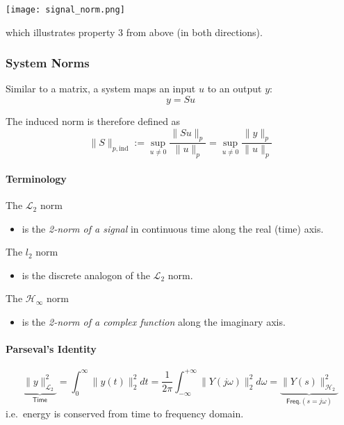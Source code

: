 \newpar{}

\begin{center}
    \texttt{[image: signal\_norm.png]}
\end{center}
which illustrates property 3 from above (in both directions).

\newpar{}
\subsubsection{System Norms}
Similar to a matrix, a system maps an input $u$ to an output $y$:
\noindent\begin{equation*}
    y=Su
\end{equation*}

The induced norm is therefore defined as
\noindent\begin{equation*}
    \|S\|_{p,\mathrm{ind}}:=\sup_{u\neq0}\frac{\|Su\|_p}{\|u\|_p}=\sup_{u\neq0}\frac{\|y\|_p}{\|u\|_p}
\end{equation*}

\paragraph{Terminology}
The $\mathcal{L}_2$ norm
\begin{itemize}
    \item is the \textit{2-norm of a signal} in continuous time along the real (time) axis.
\end{itemize}
The $l_2$ norm
\begin{itemize}
    \item is the discrete analogon of the $\mathcal{L}_2$ norm.
\end{itemize}
The $\mathcal{H}_\infty$ norm
\begin{itemize}
    \item is the \textit{2-norm of a complex function} along the imaginary axis.
\end{itemize}

\paragraph{Parseval's Identity}
\noindent\begin{equation*}
    \underbrace{\|y\|_{\mathcal{L}_2}^2}_{\textsf{Time}}=\int_0^\infty\|y(t)\|_2^2 dt=\frac1{2\pi}\int_{-\infty}^{+\infty}\|Y(j\omega)\|_2^2 d\omega=\underbrace{\|Y(s)\|_{\mathcal{H}_2}^2}_{\textsf{Freq.} (s=j\omega)}
\end{equation*}
i.e.\ energy is conserved from time to frequency domain.

